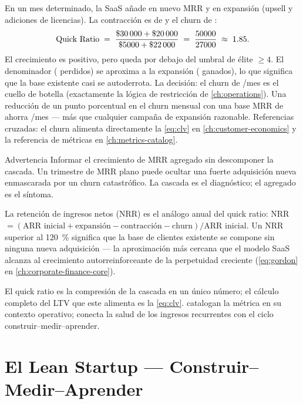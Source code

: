 \begin{example}
En un mes determinado, la SaaS añade  en nuevo MRR y  en expansión (upsell y adiciones de licencias). La contracción es de  y el churn de :
\[
  \text{Quick Ratio} \;=\; \frac{\$\num{30000}+\$\num{20000}}{\$\num{5000}+\$\num{22000}}
    \;=\; \frac{50000}{27000} \;\approx\; 1.85.
\]
El crecimiento es positivo, pero queda por debajo del umbral de élite \(\ge 4\). El denominador ( perdidos) se aproxima a la expansión ( ganados), lo que significa que la base existente casi se autoderrota. La decisión: el churn de /mes es el cuello de botella (exactamente la lógica de restricción de \cref{ch:operations}). Una reducción de un punto porcentual en el churn mensual con una base MRR de  ahorra /mes --- más que cualquier campaña de expansión razonable. Referencias cruzadas: el churn alimenta directamente la \cref{eq:clv} en \cref{ch:customer-economics} y la referencia de métricas en \cref{ch:metrics-catalog}.
\end{example}

\begin{admonition}{Advertencia}
Informar el crecimiento de MRR agregado sin descomponer la cascada. Un trimestre de MRR plano puede ocultar una fuerte adquisición nueva enmascarada por un churn catastrófico. La cascada es el diagnóstico; el agregado es el síntoma.
\end{admonition}

La retención de ingresos netos (NRR) es el análogo anual del quick ratio: NRR \(= (\text{ARR inicial} + \text{expansión} - \text{contracción} - \text{churn}) / \text{ARR inicial}\). Un NRR superior al \qty{120}{\percent} significa que la base de clientes existente se compone sin ninguna nueva adquisición --- la aproximación más cercana que el modelo SaaS alcanza al crecimiento autorreinforceante de la perpetuidad creciente (\cref{eq:gordon} en \cref{ch:corporate-finance-core}).

El quick ratio es la compresión de la cascada en un único número; el cálculo completo del LTV que este alimenta es la \cref{eq:clv}. \textcite{bendle2020marketing} catalogan la métrica en su contexto operativo; \textcite{ries2011} conecta la salud de los ingresos recurrentes con el ciclo construir--medir--aprender.

\section{El Lean Startup --- Construir--Medir--Aprender}\label{sec:lean-startup}

